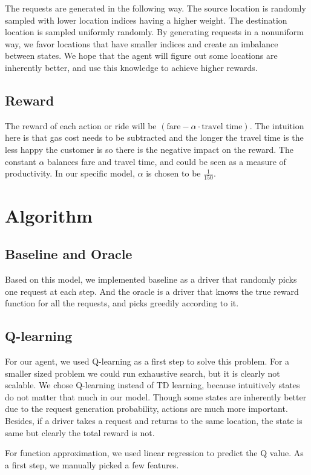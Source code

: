 \documentclass{article}
\begin{document}
The requests are generated in the following way. The source location is randomly sampled with lower location indices having a higher weight. The destination location is sampled uniformly randomly. By generating requests in a nonuniform way, we favor locations that have smaller indices and create an imbalance between states. We hope that the agent will figure out some locations are inherently better, and use this knowledge to achieve higher rewards.

\subsection{Reward}
The reward of each action or ride will be $(\text{fare}-\alpha\cdot\text{travel time})$. The intuition here is that gas cost needs to be subtracted and the longer the travel time is the less happy the customer is so there is the negative impact on the reward. The constant $\alpha$ balances fare and travel time, and could be seen as a measure of productivity. In our specific model, $\alpha$ is chosen to be $\frac{1}{150}$.

\section{Algorithm}
\subsection{Baseline and Oracle}
Based on this model, we implemented baseline as a driver that randomly picks one request at each step. And the oracle is a driver that knows the true reward function for all the requests, and picks greedily according to it.

\subsection{Q-learning}
For our agent, we used Q-learning as a first step to solve this problem. For a smaller sized problem we could run exhaustive search, but it is clearly not scalable. We chose Q-learning instead of TD learning, because intuitively states do not matter that much in our model. Though some states are inherently better due to the request generation probability, actions are much more important. Besides, if a driver takes a request and returns to the same location, the state is same but clearly the total reward is not.

For function approximation, we used linear regression to predict the Q value. As a first step, we manually picked a few features.
\end{document}
